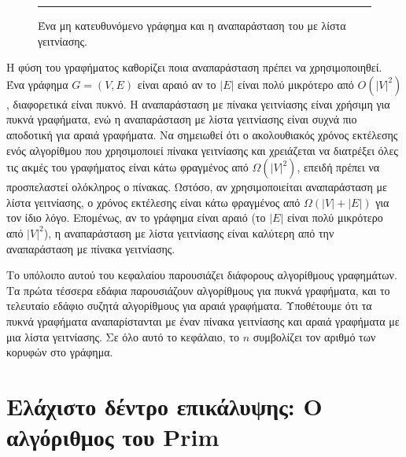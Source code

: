 \documentclass[12pt,a4paper]{article}
\begin{document}
\begin{figure}[ht]
\begin{minipage}{0.45\textwidth}

\end{minipage}

\vspace{0.3cm}
\noindent\rule{\textwidth}{0.2pt}
\caption{Ένα μη κατευθυνόμενο γράφημα και η αναπαράσταση του με λίστα γειτνίασης.}
\label{fig:graph3}
\end{figure}
\vspace{2cm}


Η φύση του γραφήματος καθορίζει ποια αναπαράσταση πρέπει να χρησιμοποιηθεί. Ένα γράφημα $G = (V, E)$ είναι αραιό αν το $|E|$ είναι πολύ μικρότερο από $O(|V|^2)$, διαφορετικά είναι πυκνό. Η αναπαράσταση με πίνακα γειτνίασης είναι χρήσιμη για πυκνά γραφήματα, ενώ η αναπαράσταση με λίστα γειτνίασης είναι συχνά πιο αποδοτική για αραιά γραφήματα. Να σημειωθεί ότι ο ακολουθιακός χρόνος εκτέλεσης ενός αλγορίθμου που χρησιμοποιεί πίνακα γειτνίασης και χρειάζεται να διατρέξει όλες τις ακμές του γραφήματος είναι κάτω φραγμένος από $\Omega(|V|^2)$, επειδή πρέπει να προσπελαστεί ολόκληρος ο πίνακας. Ωστόσο, αν χρησιμοποιείται αναπαράσταση με λίστα γειτνίασης, ο χρόνος εκτέλεσης είναι κάτω φραγμένος από $\Omega(|V| + |E|)$ για τον ίδιο λόγο. Επομένως, αν το γράφημα είναι αραιό (το $|E|$ είναι πολύ μικρότερο από $|V|^2$), η αναπαράσταση με λίστα γειτνίασης είναι καλύτερη από την αναπαράσταση με πίνακα γειτνίασης.

Το υπόλοιπο αυτού του κεφαλαίου παρουσιάζει διάφορους αλγορίθμους γραφημάτων. Τα πρώτα τέσσερα εδάφια παρουσιάζουν αλγορίθμους για πυκνά γραφήματα, και το τελευταίο εδάφιο συζητά αλγορίθμους για αραιά γραφήματα. Υποθέτουμε ότι τα πυκνά γραφήματα αναπαρίστανται με έναν πίνακα γειτνίασης και αραιά γραφήματα με μια λίστα γειτνίασης. Σε όλο αυτό το κεφάλαιο, το $n$ συμβολίζει τον αριθμό των κορυφών στο γράφημα.
\vspace{1cm}


\section{Eλάχιστο δέντρο επικάλυψης: Ο αλγόριθμος του \foreignlanguage{english}{Prim}}
\end{document}

